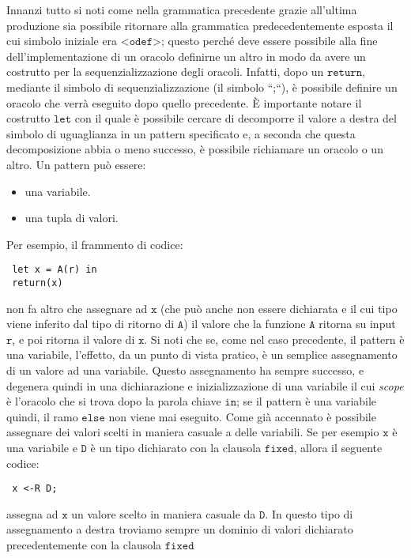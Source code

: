 \documentclass[a4paper,openright,twoside,12pt]{report}
\begin{document}
Innanzi tutto si noti come nella grammatica precedente grazie all'ultima produzione sia possibile ritornare alla grammatica predecedentemente esposta il cui simbolo iniziale era $\texttt{<odef>}$; questo perch\'e deve
essere possibile alla fine dell'implementazione di un oracolo definirne un altro in modo da avere un costrutto per la sequenzializzazione degli oracoli. 
Infatti, dopo un $\texttt{return}$, mediante il simbolo di sequenzializzazione (il simbolo ``;``), \`e possibile definire un oracolo che verr\`a eseguito dopo quello precedente.
\`E importante notare il costrutto $\texttt{let}$ con il quale \`e possibile cercare di decomporre il valore a destra del simbolo di uguaglianza in un pattern specificato e, 
a seconda che questa decomposizione abbia o meno successo, \`e possibile richiamare un oracolo o un altro. 
Un pattern pu\`o essere:
\begin{itemize}
 \item una variabile.
 \item una tupla di valori. 
\end{itemize}
Per esempio, il frammento di codice:
\begin{verbatim}
 let x = A(r) in
 return(x) 
\end{verbatim}
non fa altro che assegnare ad $\texttt{x}$ (che pu\`o anche non essere dichiarata e il cui tipo viene inferito dal tipo di ritorno di $\texttt{A}$) il valore che la funzione $\texttt{A}$ ritorna su input $\texttt{r}$, e poi ritorna il valore di $\texttt{x}$.
Si noti che se, come nel caso precedente, il pattern \`e una variabile, l'effetto, da un punto di vista pratico, \`e un semplice assegnamento di un valore ad una variabile.
Questo assegnamento ha sempre successo, e degenera quindi in una dichiarazione e inizializzazione di una variabile il cui \emph{scope} \`e l'oracolo che si trova dopo la parola chiave $\texttt{in}$; 
se il pattern \`e una variabile quindi, il ramo $\texttt{else}$ non viene mai eseguito.
Come gi\`a accennato \`e possibile assegnare dei valori scelti in maniera casuale a delle variabili. Se per esempio $\texttt{x}$ \`e una variabile e $\texttt{D}$ \`e un tipo dichiarato
con la clausola $\texttt{fixed}$, allora il seguente codice:
\begin{verbatim}
 x <-R D;
\end{verbatim}
assegna ad $\texttt{x}$ un valore scelto in maniera casuale da $\texttt{D}$. In questo tipo di assegnamento a destra troviamo sempre un dominio di valori dichiarato precedentemente con la clausola $\texttt{fixed}$ \\
\end{document}
